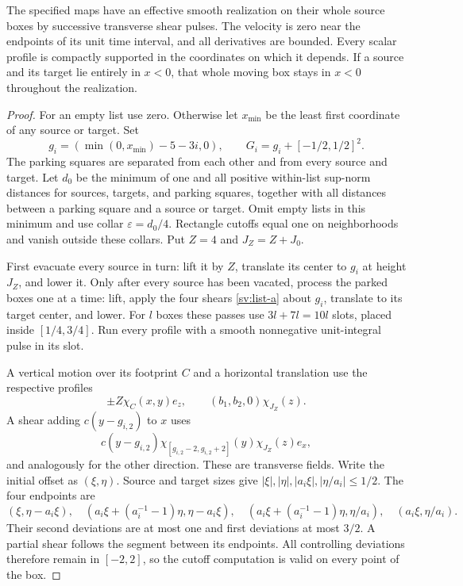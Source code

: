 \begin{lemma}\label{sv:parking-lemma}
The specified maps have an effective smooth realization on their whole
source boxes by successive transverse shear pulses.  The velocity is zero
near the endpoints of its unit time interval, and all derivatives are
bounded.  Every scalar profile is compactly supported in the coordinates
on which it depends.  If a source and its target lie entirely in $x<0$,
that whole moving box stays in $x<0$ throughout the realization.
\end{lemma}
\begin{proof}
For an empty list use zero.  Otherwise let $x_{\min}$ be the least
first coordinate of any source or target.  Set
\[
 g_i=(\min(0,x_{\min})-5-3i,0),\qquad
 G_i=g_i+[-1/2,1/2]^2.
\]
The parking squares are separated from each other and from every source
and target.  Let $d_0$ be the minimum of one and all positive within-list
sup-norm distances for sources, targets, and parking squares, together
with all distances between a parking square and a source or target.
Omit empty lists in this minimum and use collar $\varepsilon=d_0/4$.
Rectangle cutoffs equal one on neighborhoods and vanish outside these
collars.  Put $Z=4$ and $J_Z=Z+J_0$.

First evacuate every source in turn: lift it by $Z$, translate its
center to $g_i$ at height $J_Z$, and lower it.  Only after every source
has been vacated, process the parked boxes one at a time: lift, apply
the four shears \eqref{sv:list-a} about $g_i$, translate to its target
center, and lower.  For $l$ boxes these passes use $3l+7l=10l$
slots, placed inside $[1/4,3/4]$.  Run every profile with a smooth
nonnegative unit-integral pulse in its slot.

A vertical motion over its footprint $C$ and a horizontal translation
use the respective profiles
\[
 \pm Z\chi_C(x,y)e_z,\qquad (b_1,b_2,0)\chi_{J_Z}(z).
\]
A shear adding $c(y-g_{i,2})$ to $x$ uses
\[
 c(y-g_{i,2})\chi_{[g_{i,2}-2,g_{i,2}+2]}(y)
                      \chi_{J_Z}(z)e_x,
\]
and analogously for the other direction.  These are transverse fields.
Write the initial offset as $(\xi,\eta)$.  Source and target sizes
give $|\xi|,|\eta|,|a_i\xi|,|\eta/a_i|\le1/2$.
The four endpoints are
\[
 (\xi,\eta-a_i\xi),\quad
 (a_i\xi+(a_i^{-1}-1)\eta,\eta-a_i\xi),\quad
 (a_i\xi+(a_i^{-1}-1)\eta,\eta/a_i),\quad
 (a_i\xi,\eta/a_i).
\]
Their second deviations are at most one and first deviations at most
$3/2$.  A partial shear follows the segment between its endpoints.
All controlling deviations therefore remain in $[-2,2]$, so the
cutoff computation is valid on every point of the box.


\end{proof}
